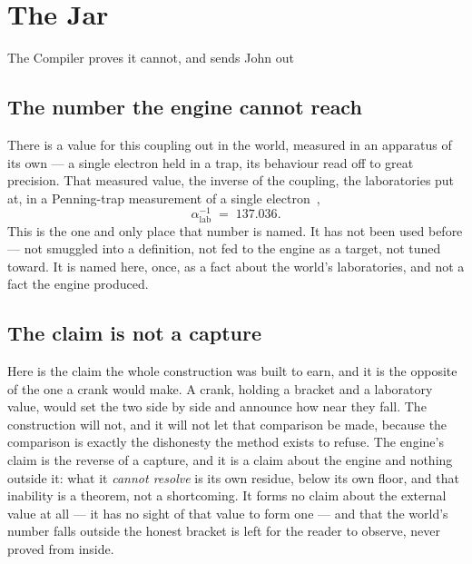 \chapter{The Jar}

\begin{chorus}{The Compiler proves it cannot, and sends John out}
\end{chorus}

\section{The number the engine cannot reach}

There is a value for this coupling out in the world, measured in an apparatus of its own --- a single electron held in
a trap, its behaviour read off to great precision.
That measured value, the inverse of the coupling, the laboratories put at, in a Penning-trap measurement of a single
electron~\cite{hanneke2008},
\[
  \alpha^{-1}_{\text{lab}} \;=\; 137.036 .
\]
This is the one and only place that number is named.
It has not been used before --- not smuggled into a definition, not fed to the engine as a target, not tuned toward.
It is named here, once, as a fact about the world's laboratories, and not a fact the engine produced.

\section{The claim is not a capture}

Here is the claim the whole construction was built to earn, and it is the opposite of the one a crank would make.
A crank, holding a bracket and a laboratory value, would set the two side by side and announce how near they fall.
The construction will not, and it will not let that comparison be made, because the comparison is exactly the dishonesty the
method exists to refuse.
The engine's claim is the reverse of a capture, and it is a claim about the engine and nothing outside it: what it
\emph{cannot resolve} is its own residue, below its own floor, and that inability is a theorem, not a shortcoming.
It forms no claim about the external value at all --- it has no sight of that value to form one --- and that the world's
number falls outside the honest bracket is left for the reader to observe, never proved from inside.

